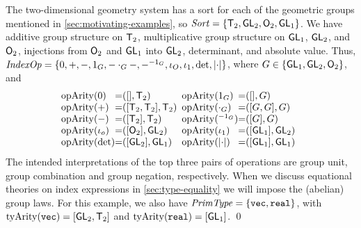 \begin{example*}
  \label{ex:two-dim-geo-operations}
  The two-dimensional geometry system has a sort for each of the
  geometric groups mentioned in \autoref{sec:motivating-examples}, so
  $\mathit{Sort} = \{\mathsf{T}_2, \mathsf{GL}_2, \mathsf{O}_2, \mathsf{GL}_1 \}$.
  We have additive group structure on $\mathsf{T}_2$, multiplicative
  group structure on $\mathsf{GL}_1$, $\mathsf{GL}_2$, and $\mathsf{O}_2$,
  injections from $\mathsf{O}_2$ and $\mathsf{GL}_1$ into $\mathsf{GL}_2$,
  determinant, and absolute value. Thus, $\mathit{IndexOp} = \{ 0, +, -,
  1_G, -\cdot_G-, -^{-1_G}, \iota_O, \iota_1, \det, \lvert \cdot \rvert \}$, where
  $G \in \{\mathsf{GL}_1, \mathsf{GL}_2, \mathsf{O}_2\}$, and
  \begin{displaymath}
    \begin{array}{@{}l@{\hspace{0em}=\hspace{0em}}l@{\hspace{0.5em}}l@{\hspace{0em}=\hspace{0em}}l}
      \indexOpArity(0) & ([], \SynTransl{2}) &
      \indexOpArity(1_G) & ([], G) \\
      \indexOpArity(+) & ([\SynTransl{2}, \SynTransl{2}], \SynTransl{2}) &
      \indexOpArity(\cdot_G) & ([G,G],G) \\
      \indexOpArity(-) & ([\SynTransl{2}], \SynTransl{2}) &
      \indexOpArity(^{-1_G}) & ([G], G) \\
      \indexOpArity(\iota_o) & ([\SynOrth{2}], \SynGL{2}) &
      \indexOpArity(\iota_1) & ([\SynGL{1}], \SynGL{2}) \\
      \indexOpArity(\det) & ([\SynGL{2}], \SynGL{1}) &
      \indexOpArity(\abs{\cdot}) & ([\SynGL{1}], \SynGL{1})
    \end{array}
  \end{displaymath}
  The intended interpretations of the top three pairs of operations
  are group unit, group combination and group negation,
  respectively. 
  When we discuss equational theories on index expressions 
in \autoref{sec:type-equality} 
we will impose the (abelian) group laws. For this example, 
we also have $\mathit{PrimType} = \{ \textup{\texttt{vec}},
  \textup{\texttt{real}} \}$, with $\mathrm{tyArity}(\textup{\texttt{vec}}) =
           [\mathsf{GL}_2, \mathsf{T}_2]$ and
           $\mathrm{tyArity}(\textup{\texttt{real}}) = [\mathsf{GL}_1]$.
\qed
\end{example*}

